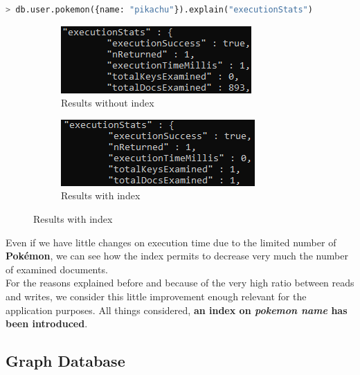 \begin{lstlisting}[language=python]
	> db.user.pokemon({name: "pikachu"}).explain("executionStats")
\end{lstlisting}
\begin{figure}[H]
	\begin{subfigure}{0.48\textwidth}
		\includegraphics[width=0.9\linewidth]{img/PokemonNameNoIndex.png} 
		\caption{Results without index}
	\end{subfigure}
	\begin{subfigure}{0.48\textwidth}
		\includegraphics[width=0.9\linewidth]{img/PokemonNameIndex.png}
		\caption{Results with index}
	\end{subfigure}
\end{figure}


Even if we have little changes on execution time due to the limited number of \textbf{Pokémon}, we can see how the index permits to decrease very much the number of examined documents. \\
For the reasons explained before and because of the very high ratio between reads and writes, we consider this little improvement enough relevant for the application purposes. All things considered, \textbf{an index on \textit{pokemon name} has been introduced}. 

\subsection{Graph Database}
